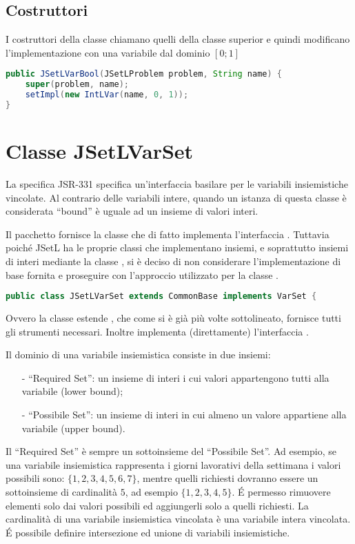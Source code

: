 \subsection{Costruttori}
I costruttori della classe chiamano quelli della classe superior 
 e quindi modificano l'implementazione con una variabile dal
dominio $[0;1]$
\begin{lstlisting}[language = Java,
                   caption = {Un costruttore di \files{JSetLVarBool}}]
public JSetLVarBool(JSetLProblem problem, String name) {
	super(problem, name);
	setImpl(new IntLVar(name, 0, 1));
}
\end{lstlisting}

\section{Classe JSetLVarSet}
La specifica JSR-331 specifica un'interfaccia basilare per le variabili
insiemistiche vincolate. Al contrario delle variabili intere, quando un
istanza di questa classe è considerata ``bound''  è uguale ad un insieme di
valori interi.

Il pacchetto  fornisce la classe 
 che di fatto implementa l'interfaccia . 
Tuttavia poiché JSetL ha le proprie classi che implementano insiemi, 
e soprattutto insiemi di interi mediante la classe , si è deciso
di non considerare l'implementazione di base fornita e proseguire con 
l'approccio utilizzato per la classe .
\begin{lstlisting}[language = Java,
                   frame = single]
public class JSetLVarSet extends CommonBase implements VarSet {
\end{lstlisting}

Ovvero la classe estende , che come si è già più volte
sottolineato, fornisce tutti gli strumenti necessari. Inoltre 
 implementa (direttamente) l'interfaccia .

\begin{flushleft}
Il dominio di una variabile insiemistica consiste in due insiemi:
\begin{enumerate}
\item[-]``Required Set'': un insieme di interi i cui valori appartengono
 tutti alla variabile (lower bound);
\item[-]``Possibile Set'': un insieme di interi in cui almeno un valore
appartiene alla variabile (upper bound).
\end{enumerate}
Il ``Required Set'' è sempre un sottoinsieme del ``Possibile Set''. Ad esempio,
se una variabile insiemistica rappresenta i giorni lavorativi della settimana 
i valori possibili sono: $\{1, 2, 3, 4, 5, 6, 7 \}$, mentre quelli richiesti
dovranno essere un sottoinsieme di cardinalità $5$, ad esempio $\{1, 2, 3, 4, 5
\}$. \'E permesso rimuovere elementi solo dai valori possibili ed
aggiungerli solo a quelli richiesti. La cardinalità di una variabile
insiemistica vincolata è una variabile intera vincolata. \'E possibile definire
intersezione ed unione di variabili insiemistiche.
\end{flushleft}

